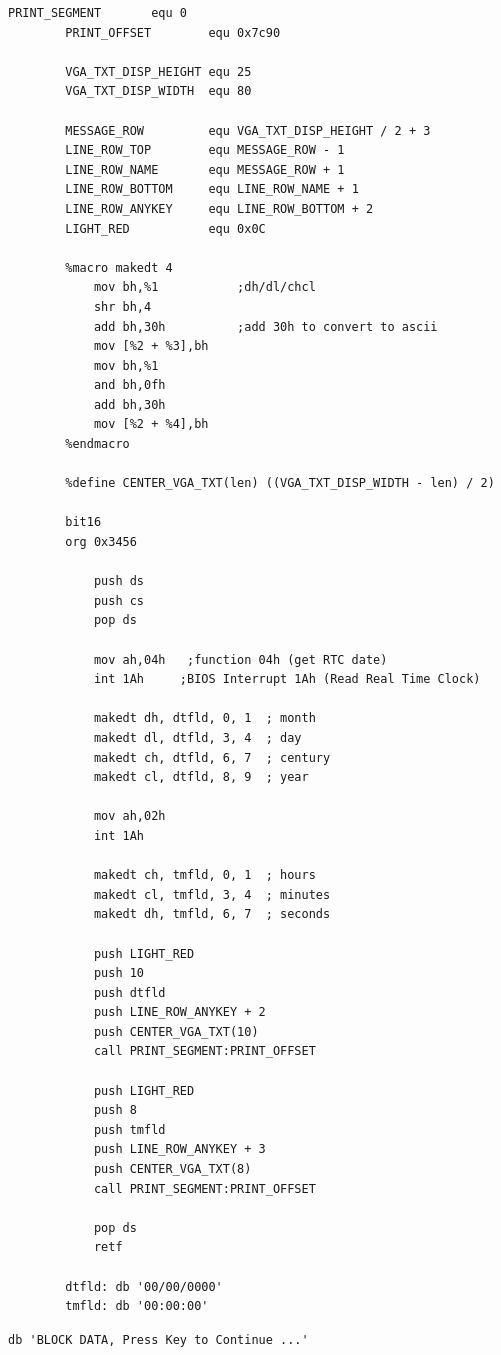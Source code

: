 \documentclass{article}
\begin{document}
    \begin{lstlisting}[caption={datetimeV05.asm listing}, captionpos=t]
        PRINT_SEGMENT       equ 0
        PRINT_OFFSET        equ 0x7c90

        VGA_TXT_DISP_HEIGHT equ 25
        VGA_TXT_DISP_WIDTH  equ 80

        MESSAGE_ROW         equ VGA_TXT_DISP_HEIGHT / 2 + 3
        LINE_ROW_TOP        equ MESSAGE_ROW - 1
        LINE_ROW_NAME       equ MESSAGE_ROW + 1
        LINE_ROW_BOTTOM     equ LINE_ROW_NAME + 1
        LINE_ROW_ANYKEY     equ LINE_ROW_BOTTOM + 2
        LIGHT_RED           equ 0x0C

        %macro makedt 4
            mov bh,%1 			;dh/dl/chcl
            shr bh,4
            add bh,30h 			;add 30h to convert to ascii
            mov [%2 + %3],bh
            mov bh,%1
            and bh,0fh
            add bh,30h
            mov [%2 + %4],bh
        %endmacro

        %define CENTER_VGA_TXT(len) ((VGA_TXT_DISP_WIDTH - len) / 2)

        bit16
        org 0x3456

            push ds
            push cs
            pop ds

            mov ah,04h	 ;function 04h (get RTC date)
            int 1Ah		;BIOS Interrupt 1Ah (Read Real Time Clock)

            makedt dh, dtfld, 0, 1  ; month
            makedt dl, dtfld, 3, 4  ; day
            makedt ch, dtfld, 6, 7  ; century
            makedt cl, dtfld, 8, 9  ; year

            mov ah,02h
            int 1Ah

            makedt ch, tmfld, 0, 1  ; hours
            makedt cl, tmfld, 3, 4  ; minutes
            makedt dh, tmfld, 6, 7  ; seconds

            push LIGHT_RED
            push 10
            push dtfld
            push LINE_ROW_ANYKEY + 2
            push CENTER_VGA_TXT(10)
            call PRINT_SEGMENT:PRINT_OFFSET

            push LIGHT_RED
            push 8
            push tmfld
            push LINE_ROW_ANYKEY + 3
            push CENTER_VGA_TXT(8)
            call PRINT_SEGMENT:PRINT_OFFSET

            pop ds
            retf

        dtfld: db '00/00/0000'
        tmfld: db '00:00:00'

    \end{lstlisting}

    \begin{lstlisting}[caption={stringV05.asm listing}, captionpos=t]
        db 'BLOCK DATA, Press Key to Continue ...'
    \end{lstlisting}
    
\end{document}

